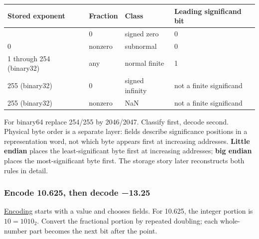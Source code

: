 {\def\LTcaptype{none} %
\begin{longtable}[]{@{}llll@{}}
\toprule\noalign{}
Stored exponent & Fraction & Class & Leading significand bit \\
\midrule\noalign{}
\endhead
\bottomrule\noalign{}
\endlastfoot
0 & 0 & signed zero & 0 \\
0 & nonzero & subnormal & 0 \\
1 through 254 (binary32) & any & normal finite & 1 \\
255 (binary32) & 0 & signed infinity & not a finite significand \\
255 (binary32) & nonzero & NaN & not a finite significand \\
\end{longtable}
}

For binary64 replace 254/255 by 2046/2047. Classify first, decode second. Physical byte order is a separate layer: fields describe significance positions in a representation word, not which byte appears first at increasing addresses. \textbf{Little endian} places the least-significant byte first at increasing addresses; \textbf{big endian} places the most-significant byte first. The storage story later reconstructs both rules in detail.

\subsubsection{Encode 10.625, then decode −13.25}\label{01-foundations-i-ch001-encode-10.625-then-decode-13.25}

\hypertarget{01-foundations-i-ch001-encode-10.625-then-decode-13.25}{}

\hyperref[appendix-6854d0e2218e]{Encoding} starts with a value and chooses fields. For 10.625, the integer portion is \(10=1010_2\). Convert the fractional portion by repeated doubling; each whole-number part becomes the next bit after the point.


